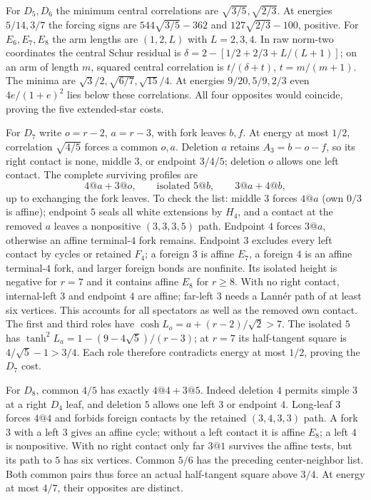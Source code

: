 \documentclass[11pt]{article}
\theoremstyle{remark}
\begin{document}
For $D_5,D_6$ the minimum central correlations are
$\sqrt{3/5},\sqrt{2/3}$. At energies $5/14,3/7$ the forcing
signs are $544\sqrt{3/5}-362$ and $127\sqrt{2/3}-100$, positive.
For $E_6,E_7,E_8$ the arm lengths are $(1,2,L)$ with $L=2,3,4$.
In raw norm-two coordinates the central Schur residual is
$\delta=2-[1/2+2/3+L/(L+1)]$; on an arm of length $m$, squared
central correlation is $t/(\delta+t)$, $t=m/(m+1)$.
The minima are $\sqrt3/2,\sqrt{6/7},\sqrt{15}/4$.
At energies $9/20,5/9,2/3$ even $4e/(1+e)^2$ lies below these
correlations. All four opposites would coincide, proving the five
extended-star costs.

For $D_7$ write $o=r-2$, $a=r-3$, with fork leaves $b,f$.
At energy at most $1/2$, correlation $\sqrt{4/5}$ forces a
common $o,a$. Deletion $a$ retains $A_3=b-o-f$, so its right
contact is none, middle $3$, or endpoint $3/4/5$; deletion $o$
allows one left contact. The complete surviving profiles are
\begin{equation}\label{eq:D7roles}
 4@a+3@o,\qquad\text{isolated }5@b,\qquad3@a+4@b,
\end{equation}
up to exchanging the fork leaves. To check the list: middle $3$
forces $4@a$ (own $0/3$ is affine); endpoint $5$ seals all white
extensions by $H_4$, and a contact at the removed $a$ leaves a
nonpositive $(3,3,3,5)$ path. Endpoint $4$ forces $3@a$, otherwise
an affine terminal-$4$ fork remains. Endpoint $3$ excludes every
left contact by cycles or retained $F_4$; a foreign $3$ is affine
$E_7$, a foreign $4$ is an affine terminal-$4$ fork, and larger
foreign bonds are nonfinite. Its isolated height is negative for
$r=7$ and it contains affine $E_8$ for $r\ge8$.
With no right contact, internal-left $3$ and endpoint $4$ are
affine; far-left $3$ needs a Lann\'er path of at least six vertices.
This accounts for all spectators as well as the removed own contact.
The first and third roles have
$\cosh L_o=a+(r-2)/\sqrt2>7$.
The isolated $5$ has
$\tanh^2L_a=1-(9-4\sqrt5)/(r-3)$; at $r=7$ its half-tangent
square is $4/\sqrt5-1>3/4$. Each role therefore contradicts
energy at most $1/2$, proving the $D_7$ cost.

For $D_8$, common $4/5$ has exactly $4@4+3@5$.
Indeed deletion $4$ permits simple $3$ at a right $D_4$ leaf,
and deletion $5$ allows one left $3$ or endpoint $4$.
Long-leaf $3$ forces $4@4$ and forbids foreign contacts by the
retained $(3,4,3,3)$ path. A fork $3$ with a left $3$ gives an
affine cycle; without a left contact it is affine $E_8$; a left
$4$ is nonpositive. With no right contact only far $3@1$ survives
the affine tests, but its path to $5$ has six vertices.
Common $5/6$ has the preceding center-neighbor list. Both common
pairs thus force an actual half-tangent square above $3/4$.
At energy at most $4/7$, their opposites are distinct.
\end{document}
